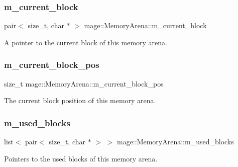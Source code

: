 \subsubsection{\texorpdfstring{m\+\_\+current\+\_\+block}{m\_current\_block}}
{\footnotesize\ttfamily pair$<$ size\+\_\+t, char $\ast$ $>$ mage\+::\+Memory\+Arena\+::m\+\_\+current\+\_\+block\hspace{0.3cm}{\ttfamily [private]}}

A pointer to the current block of this memory arena. \hypertarget{classmage_1_1_memory_arena_a880d07eb372ce1c8b907947fcbdfc59c}{}\label{classmage_1_1_memory_arena_a880d07eb372ce1c8b907947fcbdfc59c} 
\subsubsection{\texorpdfstring{m\+\_\+current\+\_\+block\+\_\+pos}{m\_current\_block\_pos}}
{\footnotesize\ttfamily size\+\_\+t mage\+::\+Memory\+Arena\+::m\+\_\+current\+\_\+block\+\_\+pos\hspace{0.3cm}{\ttfamily [private]}}

The current block position of this memory arena. \hypertarget{classmage_1_1_memory_arena_a9fc33bafde45afe06d05732572f415d1}{}\label{classmage_1_1_memory_arena_a9fc33bafde45afe06d05732572f415d1} 
\subsubsection{\texorpdfstring{m\+\_\+used\+\_\+blocks}{m\_used\_blocks}}
{\footnotesize\ttfamily list$<$ pair$<$ size\+\_\+t, char $\ast$ $>$ $>$ mage\+::\+Memory\+Arena\+::m\+\_\+used\+\_\+blocks\hspace{0.3cm}{\ttfamily [private]}}

Pointers to the used blocks of this memory arena. 